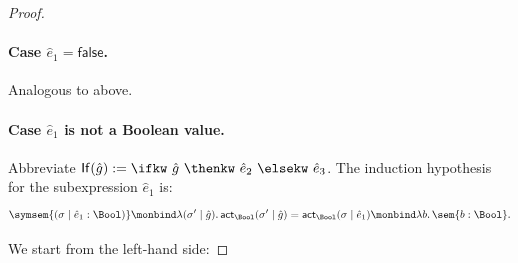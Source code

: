 \begin{proof}
  \paragraph{Case $\hat e_1 = \mathsf{false}$.} Analogous to above. 

  \paragraph{Case $\hat e_1$ is not a Boolean value.}
  Abbreviate $\mathsf{If}(\hat g) := \ifkw\ \hat g\ \thenkw\ \hat e_2\
  \elsekw\ \hat e_3$. The induction hypothesis for the subexpression $\hat e_1$ is:
  \begin{equation}
    \label{eq:if-ih}
    \symsem{(\sigma \mid \hat e_1 : \Bool)}
    \monbind
    \lambda(\sigma' \mid \hat g).\,
    \mathsf{act}_{\Bool}(\sigma' \mid \hat g)
    =
    \mathsf{act}_{\Bool}(\sigma \mid \hat e_1)
    \monbind
    \lambda b.\,\sem{b : \Bool}.
  \end{equation}
  
  We start from the left-hand side:


\end{proof}
